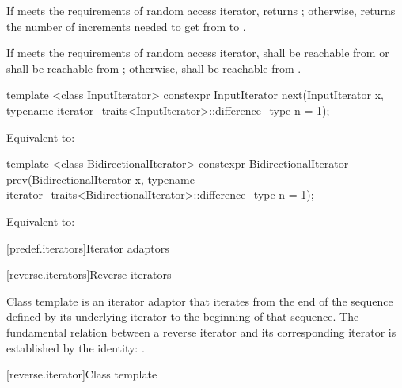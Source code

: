 \begin{itemdescr}
\pnum
\effects
If  meets the requirements of random access iterator,
returns ; otherwise, returns
the number of increments needed to get from
to
.

\pnum
\requires
If  meets the requirements of random access iterator,
 shall be reachable from  or  shall be
reachable from ; otherwise,
shall be reachable from
.
\end{itemdescr}

%
\begin{itemdecl}
template <class InputIterator>
  constexpr InputIterator next(InputIterator x,
    typename iterator_traits<InputIterator>::difference_type n = 1);
\end{itemdecl}

\begin{itemdescr}
\pnum
\effects Equivalent to: 
\end{itemdescr}

%
\begin{itemdecl}
template <class BidirectionalIterator>
  constexpr BidirectionalIterator prev(BidirectionalIterator x,
    typename iterator_traits<BidirectionalIterator>::difference_type n = 1);
\end{itemdecl}

\begin{itemdescr}
\pnum
\effects Equivalent to: 
\end{itemdescr}

[predef.iterators]{Iterator adaptors}

[reverse.iterators]{Reverse iterators}

\pnum
Class template  is an iterator adaptor that iterates from the end of the sequence defined by its underlying iterator to the beginning of that sequence.
The fundamental relation between a reverse iterator and its corresponding iterator
is established by the identity:
.

[reverse.iterator]{Class template }


